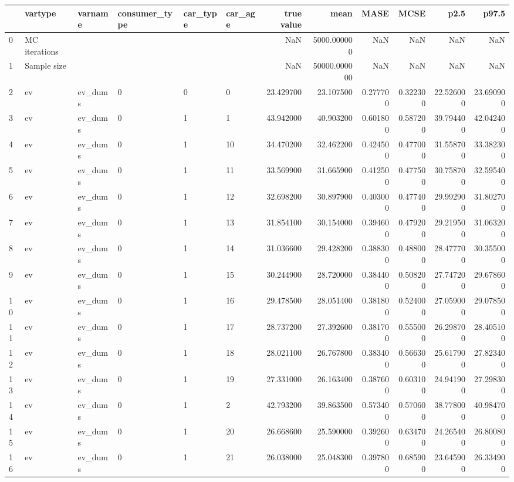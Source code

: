 \begin{tabular}{llllllrrrrrr}
\toprule
 & vartype & varname & consumer_type & car_type & car_age & true value & mean & MASE & MCSE & p2.5 & p97.5 \\
\midrule
0 & MC iterations &  &  &  &  & NaN & 5000.000000 & NaN & NaN & NaN & NaN \\
1 & Sample size &  &  &  &  & NaN & 50000.000000 & NaN & NaN & NaN & NaN \\
2 & ev & ev_dums & 0 & 0 & 0 & 23.429700 & 23.107500 & 0.277700 & 0.322300 & 22.526000 & 23.690900 \\
3 & ev & ev_dums & 0 & 1 & 1 & 43.942000 & 40.903200 & 0.601800 & 0.587200 & 39.794400 & 42.042400 \\
4 & ev & ev_dums & 0 & 1 & 10 & 34.470200 & 32.462200 & 0.424500 & 0.477000 & 31.558700 & 33.382300 \\
5 & ev & ev_dums & 0 & 1 & 11 & 33.569900 & 31.665900 & 0.412500 & 0.477500 & 30.758700 & 32.595400 \\
6 & ev & ev_dums & 0 & 1 & 12 & 32.698200 & 30.897900 & 0.403000 & 0.477400 & 29.992900 & 31.802700 \\
7 & ev & ev_dums & 0 & 1 & 13 & 31.854100 & 30.154000 & 0.394600 & 0.479200 & 29.219500 & 31.063200 \\
8 & ev & ev_dums & 0 & 1 & 14 & 31.036600 & 29.428200 & 0.388300 & 0.488000 & 28.477700 & 30.355000 \\
9 & ev & ev_dums & 0 & 1 & 15 & 30.244900 & 28.720000 & 0.384400 & 0.508200 & 27.747200 & 29.678600 \\
10 & ev & ev_dums & 0 & 1 & 16 & 29.478500 & 28.051400 & 0.381800 & 0.524000 & 27.059000 & 29.078500 \\
11 & ev & ev_dums & 0 & 1 & 17 & 28.737200 & 27.392600 & 0.381700 & 0.555000 & 26.298700 & 28.405100 \\
12 & ev & ev_dums & 0 & 1 & 18 & 28.021100 & 26.767800 & 0.383400 & 0.566300 & 25.617900 & 27.823400 \\
13 & ev & ev_dums & 0 & 1 & 19 & 27.331000 & 26.163400 & 0.387600 & 0.603100 & 24.941900 & 27.298300 \\
14 & ev & ev_dums & 0 & 1 & 2 & 42.793200 & 39.863500 & 0.573400 & 0.570600 & 38.778000 & 40.984700 \\
15 & ev & ev_dums & 0 & 1 & 20 & 26.668600 & 25.590000 & 0.392600 & 0.634700 & 24.265400 & 26.800800 \\
16 & ev & ev_dums & 0 & 1 & 21 & 26.038000 & 25.048300 & 0.397800 & 0.685900 & 23.645900 & 26.334900 \\

\end{tabular}
